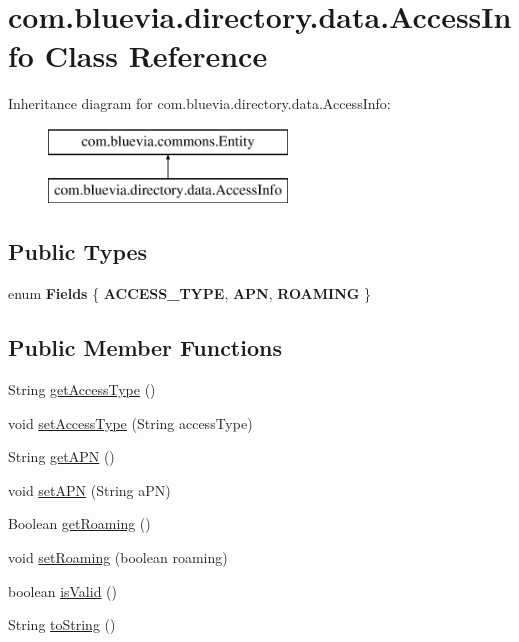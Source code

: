 \hypertarget{classcom_1_1bluevia_1_1directory_1_1data_1_1AccessInfo}{
\section{com.bluevia.directory.data.AccessInfo Class Reference}
\label{classcom_1_1bluevia_1_1directory_1_1data_1_1AccessInfo}
}
Inheritance diagram for com.bluevia.directory.data.AccessInfo:\begin{figure}[H]
\begin{center}
\leavevmode
\includegraphics[height=2.000000cm]{classcom_1_1bluevia_1_1directory_1_1data_1_1AccessInfo}
\end{center}
\end{figure}
\subsection*{Public Types}
\begin{DoxyCompactItemize}
\item 
enum {\bfseries Fields} \{ {\bfseries ACCESS\_\-TYPE}, 
{\bfseries APN}, 
{\bfseries ROAMING}
 \}
\end{DoxyCompactItemize}
\subsection*{Public Member Functions}
\begin{DoxyCompactItemize}
\item 
String \hyperlink{classcom_1_1bluevia_1_1directory_1_1data_1_1AccessInfo_ac16a02385e581facfcfa8b80be5d4d00}{getAccessType} ()
\item 
void \hyperlink{classcom_1_1bluevia_1_1directory_1_1data_1_1AccessInfo_addf16dd3f66e6391615afe4fdb591cde}{setAccessType} (String accessType)
\item 
String \hyperlink{classcom_1_1bluevia_1_1directory_1_1data_1_1AccessInfo_a697fbffea91212ba48bb05919d905a6a}{getAPN} ()
\item 
void \hyperlink{classcom_1_1bluevia_1_1directory_1_1data_1_1AccessInfo_ae79015d68396de686755681a6a670693}{setAPN} (String aPN)
\item 
Boolean \hyperlink{classcom_1_1bluevia_1_1directory_1_1data_1_1AccessInfo_aa005654fa497e7aea11c0af5196de9b1}{getRoaming} ()
\item 
void \hyperlink{classcom_1_1bluevia_1_1directory_1_1data_1_1AccessInfo_a0458976410f58ddd38095224692c09be}{setRoaming} (boolean roaming)
\item 
boolean \hyperlink{classcom_1_1bluevia_1_1directory_1_1data_1_1AccessInfo_ac895fbc26f75239fe06722fd59d7e8de}{isValid} ()
\item 
String \hyperlink{classcom_1_1bluevia_1_1directory_1_1data_1_1AccessInfo_a21c27f957be6de037a1ad49fa0de3dcc}{toString} ()
\end{DoxyCompactItemize}


